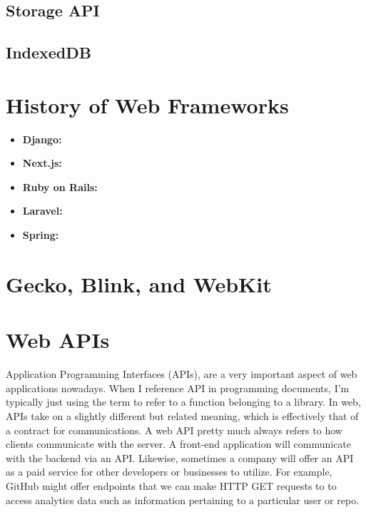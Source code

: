 \documentclass{article}
\begin{document}
\subsection{Storage API}

\subsection{IndexedDB}

\section{History of Web Frameworks}

\begin{itemize}

\item{%
    \textbf{Django:}
}

\item{%
    \textbf{Next.js:}
}

\item{%
    \textbf{Ruby on Rails:}
}

\item{%
    \textbf{Laravel:}
}

\item{%
    \textbf{Spring:}
}

\end{itemize}

\section{Gecko, Blink, and WebKit}

\section{Web APIs}

Application Programming Interfaces (APIs), are a very important aspect of web applications nowadays. When I
reference API in programming documents, I'm typically just using the term to refer to a function belonging to
a library. In web, APIs take on a slightly different but related meaning, which is effectively that of a
contract for communications. A web API pretty much always refers to how clients communicate with the server.
A front-end application will communicate with the backend via an API. Likewise, sometimes a company will offer
an API as a paid service for other developers or businesses to utilize. For example, GitHub might offer
endpoints that we can make HTTP GET requests to to access analytics data such as information pertaining to a
particular user or repo.
\end{document}

